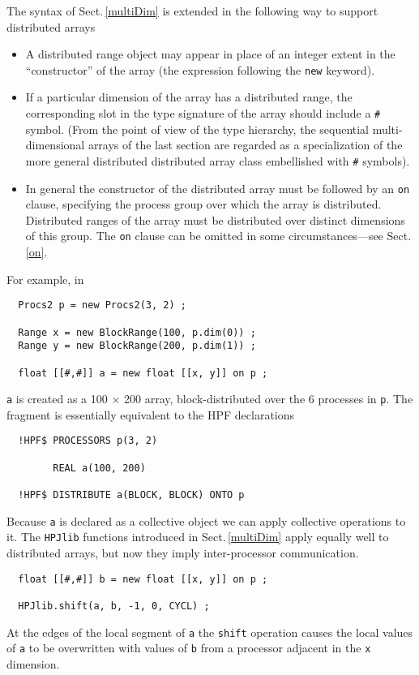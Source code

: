 The syntax of Sect.\,\ref{multiDim} is extended in the following way
to support distributed arrays
\begin{itemize}
\item
A distributed range object may appear in place of an integer extent in the
``constructor'' of the array (the expression following the {\tt new}
keyword).
\item
If a particular dimension of the array has a distributed range, the
corresponding slot in the type signature of the array should include
a {\tt \#} symbol.  (From the point of view of the type hierarchy,
the sequential multi-dimensional arrays of the last section
are regarded as a specialization of the more general distributed
distributed array class embellished with {\tt \#} symbols).
\item
In general the constructor of the distributed
array must be followed by an {\tt on} clause, specifying the process
group over which the array is distributed.  Distributed ranges
of the array must be distributed over distinct dimensions of this
group.  The {\tt on} clause can be omitted in some circumstances---see
Sect.\,\ref{on}.
\end{itemize}

For example, in
\small
\begin{verbatim}
  Procs2 p = new Procs2(3, 2) ;
  
  Range x = new BlockRange(100, p.dim(0)) ;
  Range y = new BlockRange(200, p.dim(1)) ;

  float [[#,#]] a = new float [[x, y]] on p ;
\end{verbatim}
\normalsize
{\tt a} is created as a 100 $\times$ 200 array, block-distributed
over the 6 processes in {\tt p}.  The fragment is
essentially equivalent to the HPF declarations
\small
\begin{verbatim}
  !HPF$ PROCESSORS p(3, 2)
  
        REAL a(100, 200)

  !HPF$ DISTRIBUTE a(BLOCK, BLOCK) ONTO p
\end{verbatim}
\normalsize

Because {\tt a} is declared as a collective object we can apply
collective operations to it.  The {\tt HPJlib} functions introduced in
Sect.\,\ref{multiDim} apply equally well to distributed arrays, but
now they imply inter-processor communication.
\small
\begin{verbatim}
  float [[#,#]] b = new float [[x, y]] on p ;

  HPJlib.shift(a, b, -1, 0, CYCL) ;
\end{verbatim}
\normalsize
At the edges of the local segment of {\tt a} the {\tt shift} operation
causes the local values of {\tt a} to be overwritten with values of
{\tt b} from a processor adjacent in the {\tt x} dimension.

